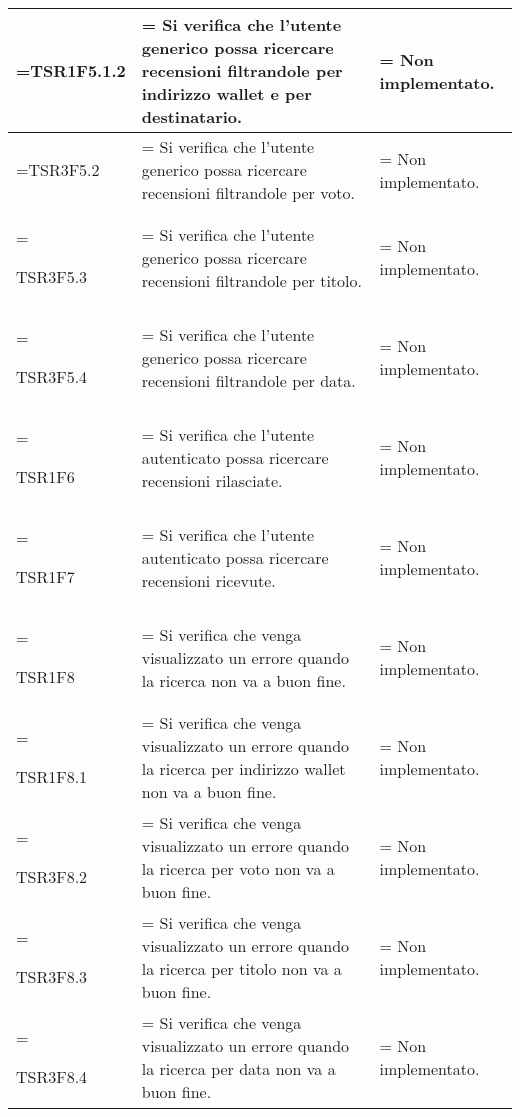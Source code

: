 \begin{xltabular}{\textwidth} {
            >{\hsize\linewidth=\hsize}X
            >{\hsize\linewidth=\hsize}X
            >{\hsize\linewidth=\hsize}X
        }
        TSR1F5.1.2&
        Si verifica che l'utente generico possa ricercare recensioni filtrandole per indirizzo wallet e per destinatario.&
        Non implementato.
        \\ \hline

        TSR3F5.2&
        Si verifica che l'utente generico possa ricercare recensioni filtrandole per voto.&
        Non implementato.
        \\ \hline
        
        TSR3F5.3&
        Si verifica che l'utente generico possa ricercare recensioni filtrandole per titolo.&
        Non implementato.
        \\ \hline

        TSR3F5.4&
        Si verifica che l'utente generico possa ricercare recensioni filtrandole per data.&
        Non implementato.
        \\ \hline

        TSR1F6&
        Si verifica che l'utente autenticato possa ricercare recensioni rilasciate. &
        Non implementato.
        \\ \hline

        TSR1F7&
        Si verifica che l'utente autenticato possa ricercare recensioni ricevute. &
        Non implementato.
        \\ \hline
        
        TSR1F8&
        Si verifica che venga visualizzato un errore quando la ricerca non va a buon fine. &
        Non implementato.
        \\ \hline

        TSR1F8.1&
        Si verifica che venga visualizzato un errore quando la ricerca per indirizzo wallet non va a buon fine. &
        Non implementato.
        \\ \hline
        
        TSR3F8.2&
        Si verifica che venga visualizzato un errore quando la ricerca per voto non va a buon fine. &
        Non implementato.
        \\ \hline
        
        TSR3F8.3&
        Si verifica che venga visualizzato un errore quando la ricerca per titolo non va a buon fine. &
        Non implementato.
        \\ \hline

        TSR3F8.4&
        Si verifica che venga visualizzato un errore quando la ricerca per data non va a buon fine. &
        Non implementato.
        \\ \hline


\end{xltabular}
